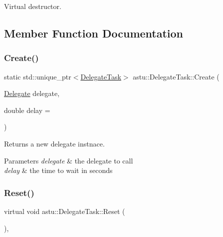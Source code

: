 Virtual destructor. 

\subsection{Member Function Documentation}
\mbox{\label{classastu_1_1DelegateTask_a3d27b0336f3f0ff70acef517312d9d37}} 
\subsubsection{\texorpdfstring{Create()}{Create()}}
{\footnotesize\ttfamily static std\+::unique\+\_\+ptr$<$\hyperlink{classastu_1_1DelegateTask}{Delegate\+Task}$>$ astu\+::\+Delegate\+Task\+::\+Create (\begin{DoxyParamCaption}\item[{\hyperlink{classastu_1_1DelegateTask_a74c7859178eb0889e884209d1604de4d}{Delegate}}]{delegate,  }\item[{double}]{delay = {} }\end{DoxyParamCaption})\hspace{0.3cm}{\ttfamily [static]}}

Returns a new delegate instnace.


\begin{DoxyParams}{Parameters}
{\em delegate} & the delegate to call \\
\hline
{\em delay} & the time to wait in seconds \\
\hline
\end{DoxyParams}
\mbox{\label{classastu_1_1DelegateTask_a8bc7364937a4af2173e066174733e1d1}} 
\subsubsection{\texorpdfstring{Reset()}{Reset()}}
{\footnotesize\ttfamily virtual void astu\+::\+Delegate\+Task\+::\+Reset (\begin{DoxyParamCaption}{ }\end{DoxyParamCaption})\hspace{0.3cm}{\ttfamily [override]}, {\ttfamily [virtual]}}

